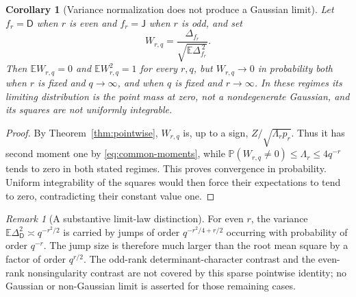 \documentclass[11pt,a4paper]{article}
\newtheorem{corollary}[theorem]{Corollary}
\theoremstyle{definition}
\theoremstyle{remark}
\newtheorem{remark}[theorem]{Remark}
\newcommand{\E}{\mathbb E}
\newcommand{\Pp}{\mathbb P}
\newcommand{\J}{\mathsf J}
\newcommand{\D}{\mathsf D}
\begin{document}
\begin{corollary}[Variance normalization does not produce a Gaussian limit]
\label{cor:non-gaussian}
Let $f_r=\D$ when $r$ is even and $f_r=\J$ when $r$ is odd, and set
\[
 W_{r,q}=\frac{\Delta_{f_r}}{\sqrt{\E\Delta_{f_r}^{\,2}}}.
\]
Then $\E W_{r,q}=0$ and $\E W_{r,q}^2=1$ for every $r,q$, but
$W_{r,q}\to0$ in probability both when $r$ is fixed and $q\to\infty$,
and when $q$ is fixed and $r\to\infty$. In these regimes its limiting
distribution is the point mass at zero, not a nondegenerate Gaussian,
and its squares are not uniformly integrable.
\end{corollary}
\begin{proof}
By Theorem~\ref{thm:pointwise}, $W_{r,q}$ is, up to a sign,
$Z/\sqrt{\Lambda_r p_r}$. Thus it has second moment one by
\eqref{eq:common-moments}, while
$\Pp(W_{r,q}\ne0)\le\Lambda_r\le4q^{-r}$ tends to zero in both
stated regimes. This proves convergence in probability. Uniform
integrability of the squares would then force their expectations to
tend to zero, contradicting their constant value one.
\end{proof}

\begin{remark}[A substantive limit-law distinction]
For even $r$, the variance $\E\Delta_\D^2\asymp q^{-r^2/2}$ is carried
by jumps of order $q^{-r^2/4+r/2}$ occurring with probability of order
$q^{-r}$. The jump size is therefore much larger than the root mean
square by a factor of order $q^{r/2}$. The odd-rank determinant-character
contrast and the even-rank nonsingularity contrast are not covered by
this sparse pointwise identity; no Gaussian or non-Gaussian limit is
asserted for those remaining cases.
\end{remark}
\end{document}
